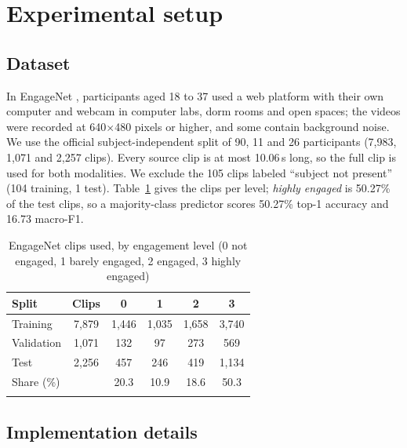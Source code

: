\documentclass[pdflatex,iicol,sn-basic]{sn-jnl}
\begin{document}
\section{Experimental setup}\label{sec:exp}

\subsection{Dataset}\label{sec:dataset}

In EngageNet \citep{singh2023engagenet}, participants aged 18 to 37 used a web platform with their own computer and webcam in computer labs, dorm rooms and open spaces; the videos were recorded at 640$\times$480 pixels or higher, and some contain background noise. We use the official subject-independent split of 90, 11 and 26 participants (7,983, 1,071 and 2,257 clips). Every source clip is at most 10.06\,s long, so the full clip is used for both modalities. We exclude the 105 clips labeled ``subject not present'' (104 training, 1 test). Table~\ref{tab:dataset} gives the clips per level; \emph{highly engaged} is 50.27\% of the test clips, so a majority-class predictor scores 50.27\% top-1 accuracy and 16.73 macro-F1.

\begin{table}[t]
\caption{EngageNet clips used, by engagement level (0 not engaged, 1 barely engaged, 2 engaged, 3 highly engaged)}\label{tab:dataset}
\begin{tabular*}{\columnwidth}{@{\extracolsep\fill}lccccc}
\toprule
Split & Clips & 0 & 1 & 2 & 3\\
\midrule
Training & 7,879 & 1,446 & 1,035 & 1,658 & 3,740\\
Validation & 1,071 & 132 & 97 & 273 & 569\\
Test & 2,256 & 457 & 246 & 419 & 1,134\\
Share (\%) & & 20.3 & 10.9 & 18.6 & 50.3\\
\botrule
\end{tabular*}
\end{table}

\subsection{Implementation details}\label{sec:impl}
\end{document}
